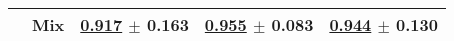 \begin{tabular}[t]{lllll}
 & Mix & \underline{\textbf{\textcolor[rgb]{0.0000000000,0.5000000000,0}{0.917}}} $\pm$ \textcolor[rgb]{0.6010743070,0.3989256930,0}{0.163} & \underline{\textbf{\textcolor[rgb]{0.0000000000,0.5000000000,0}{0.955}}} $\pm$ \textcolor[rgb]{0.0210320517,0.5000000000,0}{0.083} & \underline{\textcolor[rgb]{0.0851063830,0.5000000000,0}{0.944}} $\pm$ \textcolor[rgb]{0.2193654127,0.5000000000,0}{0.130} \\
\bottomrule
\end{tabular}

